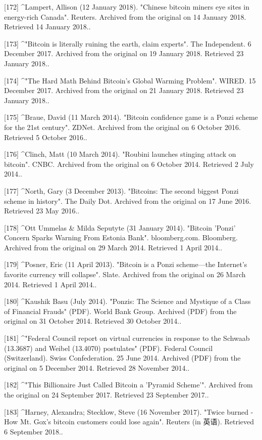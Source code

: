 [172]
^Lampert, Allison (12 January 2018). "Chinese bitcoin miners eye sites in energy-rich Canada". Reuters. Archived from the original on 14 January 2018. Retrieved 14 January 2018..

[173]
^"Bitcoin is literally ruining the earth, claim experts". The Independent. 6 December 2017. Archived from the original on 19 January 2018. Retrieved 23 January 2018..

[174]
^"The Hard Math Behind Bitcoin's Global Warming Problem". WIRED. 15 December 2017. Archived from the original on 21 January 2018. Retrieved 23 January 2018..

[175]
^Braue, David (11 March 2014). "Bitcoin confidence game is a Ponzi scheme for the 21st century". ZDNet. Archived from the original on 6 October 2016. Retrieved 5 October 2016..

[176]
^Clinch, Matt (10 March 2014). "Roubini launches stinging attack on bitcoin". CNBC. Archived from the original on 6 October 2014. Retrieved 2 July 2014..

[177]
^North, Gary (3 December 2013). "Bitcoins: The second biggest Ponzi scheme in history". The Daily Dot. Archived from the original on 17 June 2016. Retrieved 23 May 2016..

[178]
^Ott Ummelas & Milda Seputyte (31 January 2014). "Bitcoin 'Ponzi' Concern Sparks Warning From Estonia Bank". bloomberg.com. Bloomberg. Archived from the original on 29 March 2014. Retrieved 1 April 2014..

[179]
^Posner, Eric (11 April 2013). "Bitcoin is a Ponzi scheme—the Internet's favorite currency will collapse". Slate. Archived from the original on 26 March 2014. Retrieved 1 April 2014..

[180]
^Kaushik Basu (July 2014). "Ponzis: The Science and Mystique of a Class of Financial Frauds" (PDF). World Bank Group. Archived (PDF) from the original on 31 October 2014. Retrieved 30 October 2014..

[181]
^"Federal Council report on virtual currencies in response to the Schwaab (13.3687) and Weibel (13.4070) postulates" (PDF). Federal Council (Switzerland). Swiss Confederation. 25 June 2014. Archived (PDF) from the original on 5 December 2014. Retrieved 28 November 2014..

[182]
^"This Billionaire Just Called Bitcoin a 'Pyramid Scheme'". Archived from the original on 24 September 2017. Retrieved 23 September 2017..

[183]
^Harney, Alexandra; Stecklow, Steve (16 November 2017). "Twice burned - How Mt. Gox's bitcoin customers could lose again". Reuters (in 英语). Retrieved 6 September 2018..

